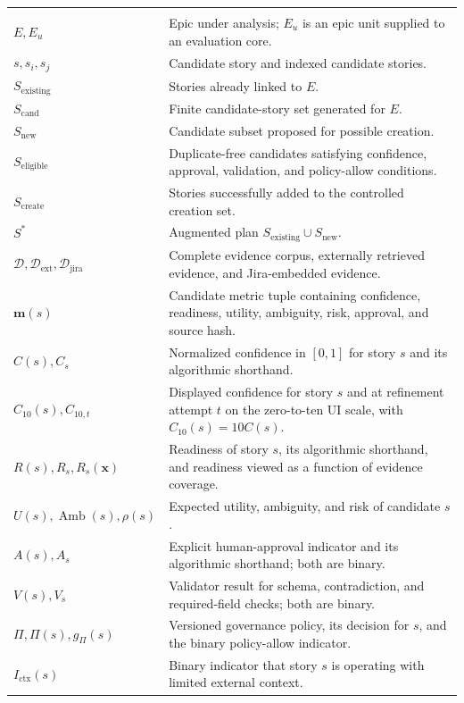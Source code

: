 \begin{longtable}{@{}>{\raggedright\arraybackslash}p{}>{\raggedright\arraybackslash}p{}@{}}
\multicolumn{2}{@{}l}{\textbf{Planning, evidence, and constrained selection}}\\
$E, E_u$ & Epic under analysis; $E_u$ is an epic unit supplied to an evaluation core. \\
$s,s_i,s_j$ & Candidate story and indexed candidate stories. \\
$S_{\mathrm{existing}}$ & Stories already linked to $E$. \\
$S_{\mathrm{cand}}$ & Finite candidate-story set generated for $E$. \\
$S_{\mathrm{new}}$ & Candidate subset proposed for possible creation. \\
$S_{\mathrm{eligible}}$ & Duplicate-free candidates satisfying confidence, approval, validation, and policy-allow conditions. \\
$S_{\mathrm{create}}$ & Stories successfully added to the controlled creation set. \\
$S^*$ & Augmented plan $S_{\mathrm{existing}}\cup S_{\mathrm{new}}$. \\
$\mathcal{D},\mathcal{D}_{\mathrm{ext}},\mathcal{D}_{\mathrm{jira}}$ & Complete evidence corpus, externally retrieved evidence, and Jira-embedded evidence. \\
$\mathbf{m}(s)$ & Candidate metric tuple containing confidence, readiness, utility, ambiguity, risk, approval, and source hash. \\
$C(s),C_s$ & Normalized confidence in $[0,1]$ for story $s$ and its algorithmic shorthand. \\
$C_{10}(s),C_{10,t}$ & Displayed confidence for story $s$ and at refinement attempt $t$ on the zero-to-ten UI scale, with $C_{10}(s)=10C(s)$. \\
$R(s),R_s,R_s(\mathbf{x})$ & Readiness of story $s$, its algorithmic shorthand, and readiness viewed as a function of evidence coverage. \\
$U(s),\operatorname{Amb}(s),\rho(s)$ & Expected utility, ambiguity, and risk of candidate $s$. \\
$A(s),A_s$ & Explicit human-approval indicator and its algorithmic shorthand; both are binary. \\
$V(s),V_s$ & Validator result for schema, contradiction, and required-field checks; both are binary. \\
$\Pi,\Pi(s),g_{\Pi}(s)$ & Versioned governance policy, its decision for $s$, and the binary policy-allow indicator. \\
$I_{\mathrm{ctx}}(s)$ & Binary indicator that story $s$ is operating with limited external context. \\

\end{longtable}
